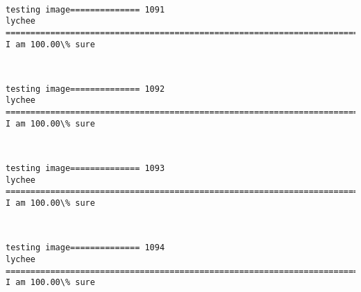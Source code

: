 \documentclass[11pt]{article}
\begin{document}
    \begin{center}
    \end{center}
    { \hspace*{\fill} \\}
    
    \begin{Verbatim}[commandchars=\\\{\}]
testing image============== 1091
lychee
============================================================================
I am 100.00\% sure

    \end{Verbatim}

    \begin{center}
    \end{center}
    { \hspace*{\fill} \\}
    
    \begin{Verbatim}[commandchars=\\\{\}]
testing image============== 1092
lychee
============================================================================
I am 100.00\% sure

    \end{Verbatim}

    \begin{center}
    \end{center}
    { \hspace*{\fill} \\}
    
    \begin{Verbatim}[commandchars=\\\{\}]
testing image============== 1093
lychee
============================================================================
I am 100.00\% sure

    \end{Verbatim}

    \begin{center}
    \end{center}
    { \hspace*{\fill} \\}
    
    \begin{Verbatim}[commandchars=\\\{\}]
testing image============== 1094
lychee
============================================================================
I am 100.00\% sure

    \end{Verbatim}
\end{document}
